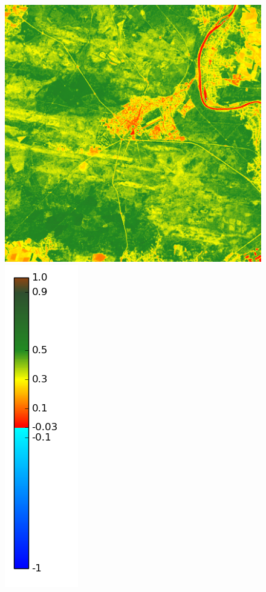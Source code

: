 \documentclass{book}
\begin{document}
\begin{figure}[H]
{\includegraphics[scale=0.2]{images/Fontainebleau/07_ndvi.png}
\includegraphics[scale=0.2]{images/colormap.png}
}
\centerline{
}
\end{figure}
\end{document}
